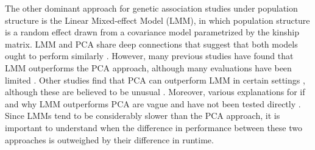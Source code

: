 \documentclass[11pt]{article}
\begin{document}
The other dominant approach for genetic association studies under population structure is the Linear Mixed-effect Model (LMM), in which population structure is a random effect drawn from a covariance model parametrized by the kinship matrix.
LMM and PCA share deep connections that suggest that both models ought to perform similarly \citep{astle_population_2009, janss_inferences_2012, hoffman_correcting_2013}.
However, many previous studies have found that LMM outperforms the PCA approach, although many evaluations have been limited \citep{zhao_arabidopsis_2007, astle_population_2009, kang_variance_2010}.
Other studies find that PCA can outperform LMM in certain settings \citep{price_new_2010, wu_comparison_2011, wang_analytical_2013}, although these are believed to be unusual \citep{sul_mixed_2013}.
Moreover, various explanations for if and why LMM outperforms PCA are vague and have not been tested directly \citep{price_new_2010, sul_mixed_2013, price_response_2013, hoffman_correcting_2013}.
Since LMMs tend to be considerably slower than the PCA approach, it is important to understand when the difference in performance between these two approaches is outweighed by their difference in runtime.
\end{document}
